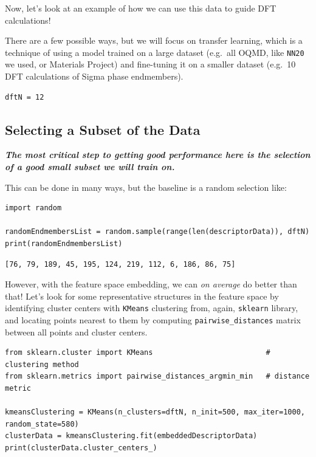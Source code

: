 Now, let's look at an example of how we can use this data to guide DFT
calculations!

There are a few possible ways, but we will focus on transfer learning,
which is a technique of using a model trained on a large dataset
(e.g.~all OQMD, like \texttt{NN20} we used, or
Materials Project) and fine-tuning it on a smaller dataset (e.g.~10 DFT
calculations of Sigma phase endmembers).

\begin{verbatim}
dftN = 12
\end{verbatim}

\hypertarget{selecting-a-subset-of-data}{%
\subsection{Selecting a Subset of the
Data}\label{pysipfenntutorial2:selecting-a-subset-of-data}}

\textbf{\emph{The most critical step to getting good performance here is
the selection of a good small subset we will train on.}}

This can be done in many ways, but the baseline is a random selection
like:

\begin{verbatim}
import random

randomEndmembersList = random.sample(range(len(descriptorData)), dftN)
print(randomEndmembersList)
\end{verbatim}

\begin{verbatim}
[76, 79, 189, 45, 195, 124, 219, 112, 6, 186, 86, 75]
\end{verbatim}

However, with the feature space embedding, we can \emph{on average} do
better than that! Let's look for some representative structures in the
feature space by identifying cluster centers with
\texttt{KMeans} clustering from, again,
\texttt{sklearn} library, and locating points nearest
to them by computing \texttt{pairwise\_distances}
matrix between all points and cluster centers.

\begin{verbatim}
from sklearn.cluster import KMeans                          # clustering method
from sklearn.metrics import pairwise_distances_argmin_min   # distance metric

kmeansClustering = KMeans(n_clusters=dftN, n_init=500, max_iter=1000, random_state=580)
clusterData = kmeansClustering.fit(embeddedDescriptorData)
print(clusterData.cluster_centers_)
\end{verbatim}

